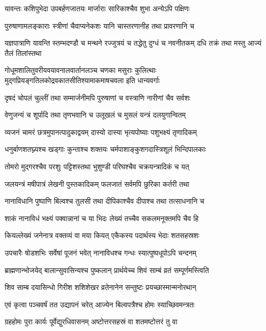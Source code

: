 \twolineshloka
{यावन्तः कशिपुभेदा उपबर्हणजातयः}
{मार्जाराः सारिकाश्चैव शुभा अन्येऽपि पक्षिणः} %

\twolineshloka
{पुरुषाणामलङ्काराः स्त्रीणां चैवाप्यनेकशः}
{यानि चास्तरणानीह तथा प्रावरणानि च} %


\threelineshloka
{यज्ञपात्राणि यावन्ति स्तम्भदण्डौ च मन्थने}
{रज्जुत्रयं च तद्धेतु दुग्धं च नवनीतकम्}
{दधि तक्रं तथा मस्तु आज्यं तैलं तिलांस्तथा} %

\twolineshloka
{गोधूमशालितुवरीयवयावनालवार्तानलञ्च चणका मसुराः कुलित्थाः}
{मुद्गप्रियङ्गतिलकोद्रवकातसीतिश्यामाकमाषचवला इति धान्यवर्गाः} %

\twolineshloka
{दृषदं चोपलं चुल्लीं तथा सम्मार्जनीमपि}
{पुरुषाणां च वस्त्राणि नारीणां चैव सर्वशः} %

\twolineshloka
{वेणुजन्यं च शूर्पादि तथा तृणभवानि च}
{उलूखलं च मुसलं यन्त्रं दलयुगान्वितम्} %

\twolineshloka
{व्यजनं चामरं छत्रमुपानत्पादुकाद्वयम्}
{दास्यो दास्या भृत्यपोष्याः पशुभक्ष्यं तृणादिकम्} %

\twolineshloka
{धनुर्बाणशतघ्न्यश्च खड्गाः कुन्ताश्च शक्तयः}
{चर्मपाशाङ्कुशगदास्त्रिशूलं भिन्दिपालकाः} %

\twolineshloka
{तोमरो मुद्गरश्चैव परशुः पट्टिशस्तथा}
{भुशुण्डी परिघश्चैव चक्रयन्त्रादिकं च यत्} %

\twolineshloka
{जलयन्त्रं मषीपात्रं लेखनी पुस्तकादिकम्}
{फलजातं सर्वमपि छुरिका कर्तरी तथा} %

\twolineshloka
{नानाविधानि पुष्पाणि बिल्वश्च तुलसी तथा}
{दीपिकाश्चैव दीपाश्च तथा तत्साधनानि च} %

\twolineshloka
{शाकं नानाविधं भक्ष्यं पक्वान्नानां च या भिदः}
{लेख्यं तच्चैव सकलमनूक्तमपि चैव हि} %

\twolineshloka
{कियल्लेख्यं जनेनात्र वक्तव्यं वा मया कियत्}
{एकैकस्य पदार्थस्य भेदाः शतसहस्रशः} %

\twolineshloka
{उपचारैः षोडशभिः सर्वेषां पूजनं भवेत्}
{नानाविधश्च गन्धः स्यात्पुष्पधूपोऽपि चन्दनम्} %

\twolineshloka
{ब्राह्मणान्भोजयेद् बालान्सुवासिन्यश्च पुष्कलान्}
{प्रार्थयेच्च शिवं साम्बं व्रतं सम्पूर्णमस्त्विति} %

\twolineshloka
{शिव साम्ब दयासिन्धो गिरीश शशिशेखर}
{व्रतेनानेन सन्तुष्टः प्रयच्छास्मान्मनोरथान्} %

\twolineshloka
{एवं कृत्वा पञ्चवर्षं तत उद्यापनं चरेत्}
{आज्येन बिल्वपत्रैश्च होमः स्याच्छिवमन्त्रतः} %

\twolineshloka
{ग्रहहोमः पुरा कार्यः पूर्वेद्युरधिवासनम्}
{अष्टोत्तरसहस्रं वा शतमष्टोत्तरं तु वा} %

